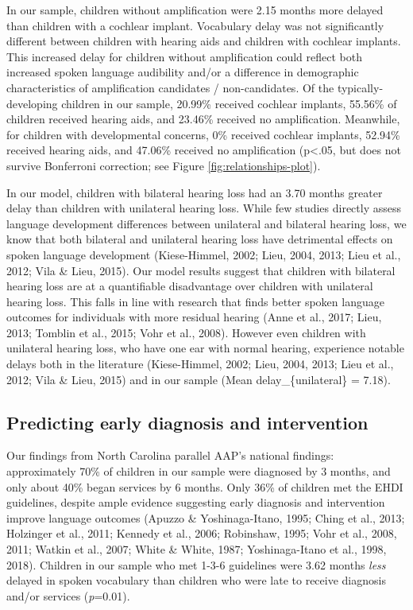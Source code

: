 \documentclass[english,man]{apa6}
\begin{document}
In our sample, children without amplification were 2.15 months more delayed than children with a cochlear implant. Vocabulary delay was not significantly different between children with hearing aids and children with cochlear implants. This increased delay for children without amplification could reflect both increased spoken language audibility and/or a difference in demographic characteristics of amplification candidates / non-candidates. Of the typically-developing children in our sample, 20.99\% received cochlear implants, 55.56\% of children received hearing aids, and 23.46\% received no amplification. Meanwhile, for children with developmental concerns, 0\% received cochlear implants, 52.94\% received hearing aids, and 47.06\% received no amplification (p\textless{}.05, but does not survive Bonferroni correction; see Figure \ref{fig:relationships-plot}).

In our model, children with bilateral hearing loss had an 3.70 months greater delay than children with unilateral hearing loss. While few studies directly assess language development differences between unilateral and bilateral hearing loss, we know that both bilateral and unilateral hearing loss have detrimental effects on spoken language development (Kiese-Himmel, 2002; Lieu, 2004, 2013; Lieu et al., 2012; Vila \& Lieu, 2015). Our model results suggest that children with bilateral hearing loss are at a quantifiable disadvantage over children with unilateral hearing loss. This falls in line with research that finds better spoken language outcomes for individuals with more residual hearing (Anne et al., 2017; Lieu, 2013; Tomblin et al., 2015; Vohr et al., 2008). However even children with unilateral hearing loss, who have one ear with normal hearing, experience notable delays both in the literature (Kiese-Himmel, 2002; Lieu, 2004, 2013; Lieu et al., 2012; Vila \& Lieu, 2015) and in our sample (Mean delay\_\{unilateral\} = 7.18).

\hypertarget{predicting-early-diagnosis-and-intervention}{%
\subsection{Predicting early diagnosis and intervention}\label{predicting-early-diagnosis-and-intervention}}

Our findings from North Carolina parallel AAP's national findings: approximately 70\% of children in our sample were diagnosed by 3 months, and only about 40\% began services by 6 months. Only 36\% of children met the EHDI guidelines, despite ample evidence suggesting early diagnosis and intervention improve language outcomes (Apuzzo \& Yoshinaga-Itano, 1995; Ching et al., 2013; Holzinger et al., 2011; Kennedy et al., 2006; Robinshaw, 1995; Vohr et al., 2008, 2011; Watkin et al., 2007; White \& White, 1987; Yoshinaga-Itano et al., 1998, 2018). Children in our sample who met 1-3-6 guidelines were 3.62 months \emph{less} delayed in spoken vocabulary than children who were late to receive diagnosis and/or services (\emph{p}=0.01).
\end{document}
